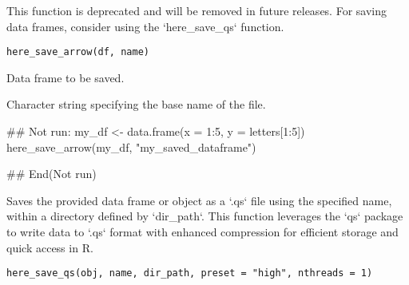 \documentclass[a4paper]{book}
\begin{document}
%
\begin{Description}
This function is deprecated and will be removed in future releases.
For saving data frames, consider using the `here\_save\_qs` function.
\end{Description}
%
\begin{Usage}
\begin{verbatim}
here_save_arrow(df, name)
\end{verbatim}
\end{Usage}
%
\begin{Arguments}
\begin{ldescription}
\item[\code{df}] Data frame to be saved.

\item[\code{name}] Character string specifying the base name of the file.
\end{ldescription}
\end{Arguments}
%
\begin{Examples}
\begin{ExampleCode}
## Not run: 
my_df <- data.frame(x = 1:5, y = letters[1:5])
here_save_arrow(my_df, "my_saved_dataframe")

## End(Not run)

\end{ExampleCode}
\end{Examples}
%
\begin{Description}
Saves the provided data frame or object as a `.qs` file using the specified name, within a directory defined by `dir\_path`.
This function leverages the `qs` package to write data to `.qs` format with enhanced compression for efficient storage and quick access in R.
\end{Description}
%
\begin{Usage}
\begin{verbatim}
here_save_qs(obj, name, dir_path, preset = "high", nthreads = 1)
\end{verbatim}
\end{Usage}
%
\end{document}
